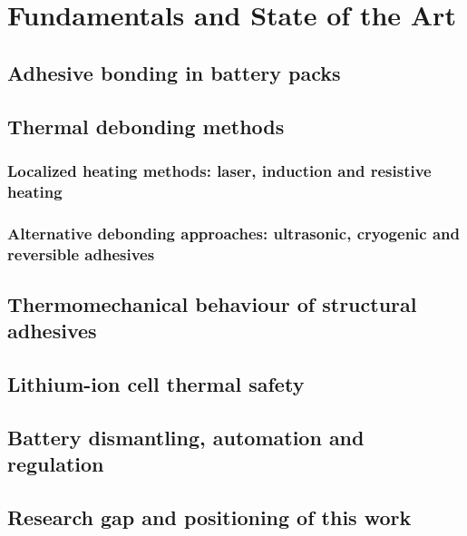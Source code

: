 \chapter{Fundamentals and State of the Art}

\section{Adhesive bonding in battery packs}

\section{Thermal debonding methods}

\subsection{Localized heating methods: laser, induction and resistive heating}

\subsection{Alternative debonding approaches: ultrasonic, cryogenic and reversible adhesives}

\section{Thermomechanical behaviour of structural adhesives}

\section{Lithium-ion cell thermal safety}

\section{Battery dismantling, automation and regulation}

\section{Research gap and positioning of this work}
